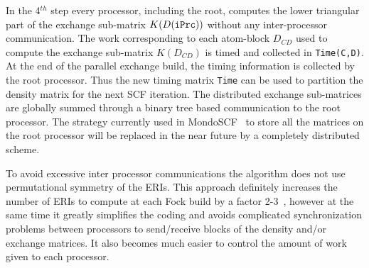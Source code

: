 \documentclass[prl,preprint,doublespace]{revtex4} %
\begin{document}
 In the 4$^{th}$ step every processor, including the root, computes 
 the lower triangular part of the exchange sub-matrix $K(D({\tt iPrc}))$ 
 without any inter-processor communication. 
 The work corresponding to each atom-block
 $D_{CD}$ used to compute the exchange 
 sub-matrix $K(D_{CD})$ is timed and collected in {\tt Time(C,D)}.
 At the end of the parallel exchange build, 
 the timing information is collected by the root processor.
 Thus the new timing matrix {\tt Time} can be used to partition the density 
 matrix for the next SCF iteration.
 The distributed exchange sub-matrices are globally 
 summed through a binary tree based communication to the root processor.
 The strategy currently used in {\sc MondoSCF}~\cite{MondoSCF_1.0-alpha-10} to store all the matrices on 
 the root processor will be replaced in the near future
 by a completely distributed scheme.
 
 To avoid excessive inter processor communications the algorithm 
 does not use permutational symmetry of the ERIs. This approach
 definitely increases the number of ERIs to compute at each Fock build by a factor 2-3~\cite{ESchwegler00},
 however at the same time it greatly simplifies the coding and avoids complicated
 synchronization problems between processors to send/receive blocks of the 
 density and/or exchange matrices. It also becomes much 
 easier to control the amount of work given to each processor.


\end{document}
